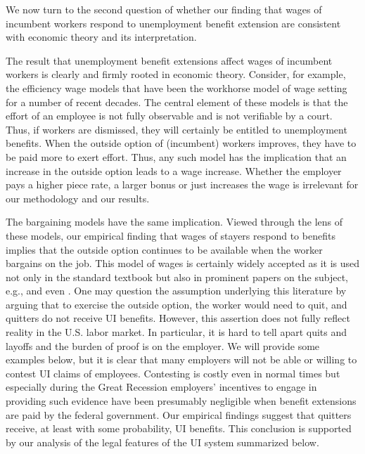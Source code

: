 \documentclass[12pt]{article}
\newcommand{\1}{\mathbf{1}}
\begin{document}
\begin{appendix}
We now turn to the second question of whether our finding that wages of incumbent workers respond to unemployment benefit extension are consistent with economic theory and its interpretation.

The result that unemployment benefit extensions affect wages of incumbent workers is clearly and firmly rooted in economic theory. Consider, for example, the efficiency wage models that have been the workhorse model of wage setting for a number of recent decades. The central element of these models is that the effort of an employee is not fully observable and is not verifiable by a court. Thus, if workers are dismissed, they will certainly be entitled to unemployment benefits. When the outside option of (incumbent) workers improves, they have to be paid more to exert effort. Thus, any such model has the implication that an increase in the outside option leads to a wage increase. Whether the employer pays a higher piece rate, a larger bonus or just increases the wage is irrelevant for our methodology and our results. %

The bargaining models have the same implication. Viewed through the lens of these models, our empirical finding that wages of stayers respond to benefits implies that the outside option continues to be available when the worker bargains on the job. This model of wages is certainly widely accepted as it is used not only in the standard \citet{pissarides:00} textbook but also in prominent papers on the subject, e.g., \citet{hall+milgrom:08} and even \citet{hall:05}. One may question the assumption underlying this literature by arguing that to exercise the outside option, the worker would need to quit, and quitters do not receive UI benefits. However, this assertion does not fully reflect reality in the U.S. labor market. In particular, it is hard to tell apart quits and layoffs and the burden of proof is on the employer. We will provide some examples below, but it is clear that many employers will not be able or willing to contest UI claims of employees. Contesting is costly even in normal times but especially during the Great Recession employers' incentives to engage in providing such evidence have been presumably negligible when benefit extensions are paid by the federal government. Our empirical findings suggest that quitters receive, at least with some probability, UI benefits. This conclusion is supported by our analysis of the legal features of the UI system summarized below.




\end{appendix}
\end{document}
